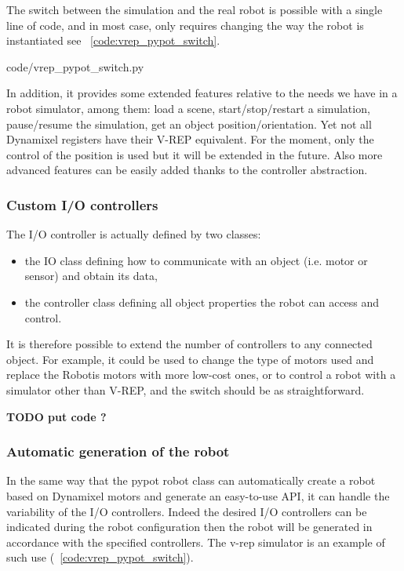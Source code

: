 The switch between the simulation and the real robot is possible with a single line of code, and in most case, only requires changing the way the robot is instantiated see \codename~\ref{code:vrep_pypot_switch}.


    {code/vrep_pypot_switch.py}

In addition, it provides some extended features relative to the needs we have in a robot simulator, among them:
load a scene, start/stop/restart a simulation, pause/resume the simulation, get an object position/orientation.
Yet not all Dynamixel registers have their V-REP equivalent. For the moment, only the control of the position is used but it will be extended in the future. Also more advanced features can be easily added thanks to the controller abstraction.


\subsubsection{Custom I/O controllers} %

The I/O controller is actually defined by two classes:

\begin{itemize}
    \item the IO class defining how to communicate with an object (i.e. motor or sensor) and obtain its data,
    \item the controller class defining all object properties the robot can access and control.
\end{itemize}

It is therefore possible to extend the number of controllers to any connected object. For example, it could be used to change the type of motors used and replace the Robotis motors with more low-cost ones, or to control a robot with a simulator other than V-REP, and the switch should be as straightforward.


\textbf{TODO put code ?}


\subsubsection{Automatic generation of the robot} %
In the same way that the pypot robot class can automatically create a robot based on Dynamixel motors and generate an easy-to-use API, it can handle the variability of the I/O controllers. Indeed the desired I/O controllers can be indicated during the robot configuration then the robot will be generated in accordance with the specified controllers. The v-rep simulator is an example of such use (\codename~\ref{code:vrep_pypot_switch}).

